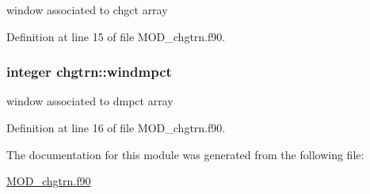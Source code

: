 window associated to chgct array 



Definition at line 15 of file M\-O\-D\-\_\-chgtrn.\-f90.

\hypertarget{classchgtrn_ae6b8df4e210f02a9b8a96ec153e4300d}{
\subsubsection[{windmpct}]{\setlength{\rightskip}{0pt plus 5cm}integer chgtrn\-::windmpct}}\label{classchgtrn_ae6b8df4e210f02a9b8a96ec153e4300d}


window associated to dmpct array 



Definition at line 16 of file M\-O\-D\-\_\-chgtrn.\-f90.



The documentation for this module was generated from the following file\-:\begin{DoxyCompactItemize}
\item 
\hyperlink{MOD__chgtrn_8f90}{M\-O\-D\-\_\-chgtrn.\-f90}\end{DoxyCompactItemize}
